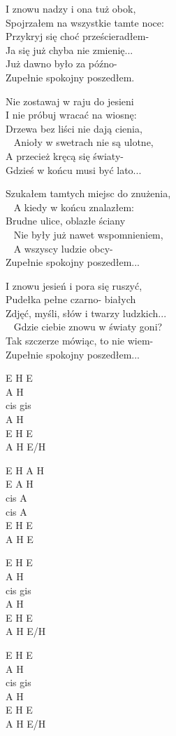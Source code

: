 \begin{text}
I znowu nadzy i ona tuż obok, \\
Spojrzałem na wszystkie tamte noce:\\
Przykryj się choć prześcieradłem-\\
Ja się już chyba nie zmienię...\\
Już dawno było za późno-\\
Zupełnie spokojny poszedłem. 

\vin Nie zostawaj w raju do jesieni\\
\vin I nie próbuj wracać na wiosnę:\\
\vin Drzewa bez liści nie dają cienia,\\ 
\vin Anioły w swetrach nie są ulotne,\\
\vin A przecież kręcą się światy-\\
\vin Gdzieś w końcu musi być lato... 

Szukałem tamtych miejsc do znużenia,\\ 
A kiedy w końcu znalazłem:\\
Brudne ulice, oblazłe ściany\\ 
Nie były już nawet wspomnieniem,\\ 
A wszyscy ludzie obcy-\\
Zupełnie spokojny poszedłem... 

I znowu jesień i pora się ruszyć,\\
Pudełka pełne czarno- białych\\
Zdjęć, myśli, słów i twarzy ludzkich...\\ 
Gdzie ciebie znowu w światy goni?\\
Tak szczerze mówiąc, to nie wiem-\\
Zupełnie spokojny poszedłem... 
\end{text}
\begin{chord}
    E H E\\
    A H\\
    cis gis\\
    A H\\
    E H E\\
    A H E/H

    E H A H\\
    E A H\\
    cis A\\
    cis A\\
    E H E\\
    A H E

    E H E\\
    A H\\
    cis gis\\
    A H\\
    E H E\\
    A H E/H

    E H E\\
    A H\\
    cis gis\\
    A H\\
    E H E\\
    A H E/H
\end{chord}
